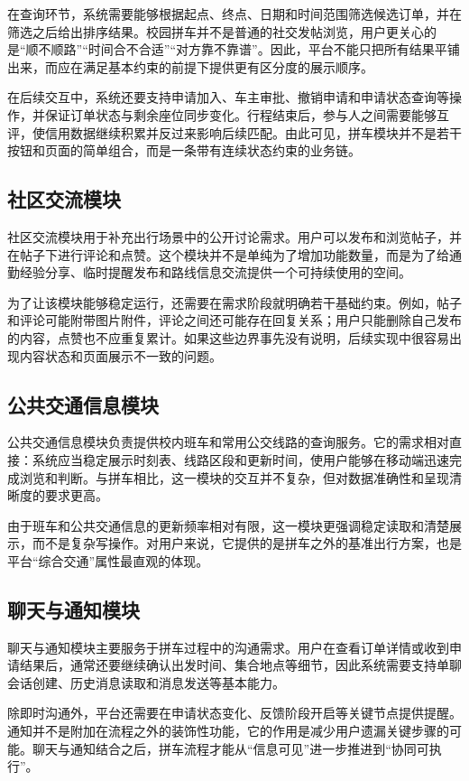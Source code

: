 在查询环节，系统需要能够根据起点、终点、日期和时间范围筛选候选订单，并在筛选之后给出排序结果。校园拼车并不是普通的社交发帖浏览，用户更关心的是“顺不顺路”“时间合不合适”“对方靠不靠谱”。因此，平台不能只把所有结果平铺出来，而应在满足基本约束的前提下提供更有区分度的展示顺序。

在后续交互中，系统还要支持申请加入、车主审批、撤销申请和申请状态查询等操作，并保证订单状态与剩余座位同步变化。行程结束后，参与人之间需要能够互评，使信用数据继续积累并反过来影响后续匹配。由此可见，拼车模块并不是若干按钮和页面的简单组合，而是一条带有连续状态约束的业务链。

\subsection{社区交流模块}

社区交流模块用于补充出行场景中的公开讨论需求。用户可以发布和浏览帖子，并在帖子下进行评论和点赞。这个模块并不是单纯为了增加功能数量，而是为了给通勤经验分享、临时提醒发布和路线信息交流提供一个可持续使用的空间。

为了让该模块能够稳定运行，还需要在需求阶段就明确若干基础约束。例如，帖子和评论可能附带图片附件，评论之间还可能存在回复关系；用户只能删除自己发布的内容，点赞也不应重复累计。如果这些边界事先没有说明，后续实现中很容易出现内容状态和页面展示不一致的问题。


\subsection{公共交通信息模块}

公共交通信息模块负责提供校内班车和常用公交线路的查询服务。它的需求相对直接：系统应当稳定展示时刻表、线路区段和更新时间，使用户能够在移动端迅速完成浏览和判断。与拼车相比，这一模块的交互并不复杂，但对数据准确性和呈现清晰度的要求更高。

由于班车和公共交通信息的更新频率相对有限，这一模块更强调稳定读取和清楚展示，而不是复杂写操作。对用户来说，它提供的是拼车之外的基准出行方案，也是平台“综合交通”属性最直观的体现。

\subsection{聊天与通知模块}

聊天与通知模块主要服务于拼车过程中的沟通需求。用户在查看订单详情或收到申请结果后，通常还要继续确认出发时间、集合地点等细节，因此系统需要支持单聊会话创建、历史消息读取和消息发送等基本能力。

除即时沟通外，平台还需要在申请状态变化、反馈阶段开启等关键节点提供提醒。通知并不是附加在流程之外的装饰性功能，它的作用是减少用户遗漏关键步骤的可能。聊天与通知结合之后，拼车流程才能从“信息可见”进一步推进到“协同可执行”。


